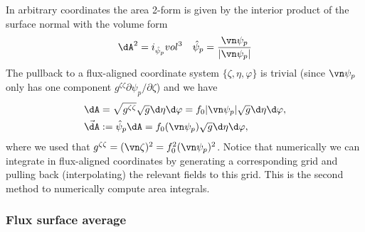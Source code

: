 In arbitrary coordinates the area 2-form is given by the interior product of the
surface normal with the volume form
\begin{align}
\label{}
\dA^2 = i_{\hat \psi_p} vol^3 \quad \hat \psi_p = \frac{\vn \psi_p}{|\vn \psi_p|}
\end{align}
The pullback to a flux-aligned coordinate system $\{\zeta, \eta, \varphi\}$ is trivial (since $\vn \psi_p$ only has one component $g^{\zeta\zeta} \partial \psi_p / \partial \zeta$) and we have
\begin{align}
\dA &= \sqrt{g^{\zeta\zeta}} \sqrt{g} \d\eta\d\varphi = f_0|\vn\psi_p|\sqrt{g}\d\eta\d\varphi,
\\
\vec\dA &:= \hat\psi_p \dA = f_0 (\vn\psi_p) \sqrt{g}\d\eta\d\varphi,\quad
\label{}
\end{align}
where we used that $g^{\zeta\zeta} = (\vn\zeta)^2 = f_0^2(\vn\psi_p)^2$.
Notice that numerically we can integrate in flux-aligned coordinates by generating a corresponding
grid and pulling back (interpolating) the relevant fields to this grid. This is the second method
to numerically compute area integrals.

\subsubsection{Flux surface average}


